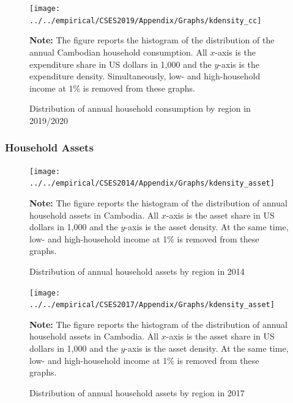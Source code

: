 \documentclass[11pt,letterpaper]{article}
\begin{document}
\begin{figure}
	\centering
	\caption{Distribution of annual household consumption by region in 2019/2020}
	\label{}
	\texttt{[image: ../../empirical/CSES2019/Appendix/Graphs/kdensity\_cc]}
	\begin{tablenotes}
		\footnotesize
		\item \textbf{Note:} The figure reports the histogram of the distribution of the annual Cambodian household consumption. All $x$-axis is the expenditure share in US dollars in 1,000 and the $y$-axis is the expenditure density. Simultaneously, low- and high-household income at 1\% is removed from these graphs. 
	\end{tablenotes} 
\end{figure}
\clearpage
\subsubsection{Household Assets}
\begin{figure}[h!]
	\centering
	\caption{Distribution of annual household assets by region in 2014}
	\label{}
	\texttt{[image: ../../empirical/CSES2014/Appendix/Graphs/kdensity\_asset]}
	\begin{tablenotes}
		\footnotesize
		\item \textbf{Note:} The figure reports the histogram of the distribution of annual household assets in Cambodia. All $x$-axis is the asset share in US dollars in 1,000 and the $y$-axis is the asset density. At the same time, low- and high-household income at 1\% is removed from these graphs. 
	\end{tablenotes} 
\end{figure}

\begin{figure}
	\centering
	\caption{Distribution of annual household assets by region in 2017}
	\label{}
	\texttt{[image: ../../empirical/CSES2017/Appendix/Graphs/kdensity\_asset]}
	\begin{tablenotes}
		\footnotesize
		\item \textbf{Note:} The figure reports the histogram of the distribution of annual household assets in Cambodia. All $x$-axis is the asset share in US dollars in 1,000 and the $y$-axis is the asset density. At the same time, low- and high-household income at 1\% is removed from these graphs. 
	\end{tablenotes} 
\end{figure}
\end{document}
